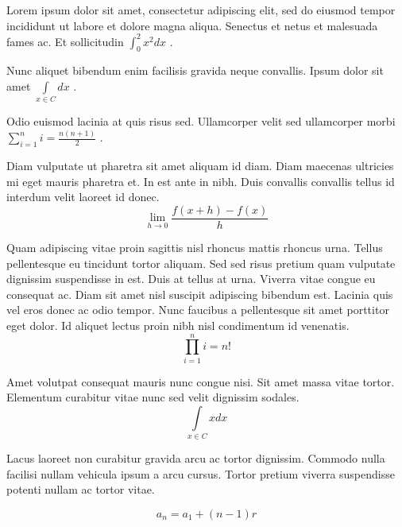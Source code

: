\documentclass{article}
\begin{document}
Lorem ipsum dolor sit amet, consectetur adipiscing elit, sed do eiusmod tempor incididunt ut labore et dolore magna aliqua. Senectus et netus et malesuada fames ac. Et sollicitudin 
\begin{math}
	\int_0^2x^2dx
\end{math}
.\newline
 
Nunc aliquet bibendum enim facilisis gravida neque convallis. Ipsum dolor sit amet 
$ \int\limits_{x\in C}dx $
.\newline
    
Odio euismod lacinia at quis risus sed. Ullamcorper velit sed ullamcorper morbi 
\( \sum_{i=1}^{n}i=\frac{n(n+1)}{2} \)
.\newline

Diam vulputate ut pharetra sit amet aliquam id diam. Diam maecenas ultricies mi eget mauris pharetra et. In est ante in nibh. Duis convallis convallis tellus id interdum velit laoreet id donec. 
\[ \lim_{h\to 0}\frac{f(x+h)-f(x)}{h} \]

Quam adipiscing vitae proin sagittis nisl rhoncus mattis rhoncus urna. Tellus pellentesque eu tincidunt tortor aliquam. Sed sed risus pretium quam vulputate dignissim suspendisse in est. Duis at tellus at urna. Viverra vitae congue eu consequat ac. Diam sit amet nisl suscipit adipiscing bibendum est. Lacinia quis vel eros donec ac odio tempor. Nunc faucibus a pellentesque sit amet porttitor eget dolor. Id aliquet lectus proin nibh nisl condimentum id venenatis.
$$ \prod_{i=1}^ni=n! $$

Amet volutpat consequat mauris nunc congue nisi. Sit amet massa vitae tortor. Elementum curabitur vitae nunc sed velit dignissim sodales. 
\begin{displaymath}
	\int\limits_{x\in C}xdx
\end{displaymath}

Lacus laoreet non curabitur gravida arcu ac tortor dignissim. Commodo nulla facilisi nullam vehicula ipsum a arcu cursus. Tortor pretium viverra suspendisse potenti nullam ac tortor vitae. 

\begin{equation}
	a_{n}=a_{1}+(n-1)r
\end{equation}
\end{document}
